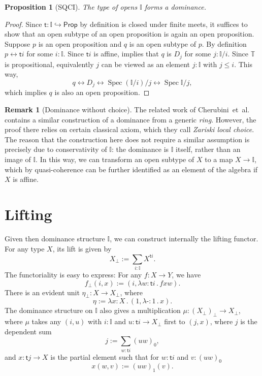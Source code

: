 \documentclass[12pt]{amsart}
\newtheorem{proposition}[theorem]{Proposition}
\theoremstyle{definition}
\newtheorem{remark}[theorem]{Remark}
\newcommand{\mbb}[1]{\mathbb{#1}}
\newcommand{\T}{\mbb T}
\newcommand{\I}{\mbb I}
\newcommand{\ms}[1]{\mathsf{#1}}
\newcommand{\hook}{\hookrightarrow}
\newcommand{\prt}{_{\bot}}
\newcommand{\ld}[2]{\lambda #1\!\colon\!\!#2\mathpunct{.}}
\newcommand{\eq}{\leftrightarrow}
\newcommand{\pp}{\ms{Prop}}
\newcommand{\hp}{\text{-}}
\newcommand{\spec}{\operatorname{Spec}}
\begin{document}
\begin{proposition}[SQCI]\label{prop:Idominance}
  The type of opens $\I$ forms a dominance.
\end{proposition}
\begin{proof}
  Since $\ms t \colon \I \hook \pp$ by definition is closed under finite meets, it suffices to show that an open subtype of an open proposition is again an open proposition. Suppose $p$ is an open proposition and $q$ is an open subtype of $p$. By definition $p \eq \ms ti$ for some $i:\I$. Since $\ms ti$ is affine,  implies that $q$ is $D_j$ for some $j : \I/i$. Since $\T$ is propositional, equivalently $j$ can be viewed as an element $j : \I$ with $j \le i$. This way, 
  \[ q \eq D_j \eq \spec(\I/i)/j \eq \spec\I/j, \]
  which implies $q$ is also an open proposition.
\end{proof}

\begin{remark}[Dominance without choice]\label{rem:dominancewithoutchoice}
  The related work of Cherubini~et~al.~\cite{Cherubini_Coquand_Hutzler_2024} contains a similar construction of a dominance from a generic \emph{ring}. However, the proof there relies on certain classical axiom, which they call \emph{Zariski local choice}. The reason that the construction here does not require a similar assumption is precisely due to conservativity of $\I$: the dominance is $\I$ itself, rather than an image of $\I$. In this way, we can transform an open subtype of $X$ to a map $X \to \I$, which by quasi-coherence can be further identified as an element of the algebra if $X$ is affine. 
\end{remark}


\section{Lifting}\label{sec:lifting}

Given then dominance structure $\I$, we can construct internally the lifting functor. For any type $X$, its lift is given by
\[ X\prt := \sum_{i:\I}X^{\ms ti}. \]
The functoriality is easy to express: For any $f : X \to Y$, we have
\[ f\prt(i,x) := (i,\ld{w}{\ms ti}fxw). \]
There is an evident unit $\eta\prt : X \to X\prt$, where
\[ \eta := \ld x X(1,\ld\hp 1 x). \]
The dominance structure on $\I$ also gives a multiplication $\mu : (X\prt)\prt \to X\prt$, where $\mu$ takes any $(i,u)$ with $i : \I$ and $u : \ms ti \to X\prt$ first to $(j,x)$, where $j$ is the dependent sum
\[ j := \sum_{w:\ms ti} (uw)_0, \]
and $x : \ms tj \to X$ is the partial element such that for $w : \ms ti$ and $v : (uw)_0$
\[ x(w,v) := (uw)_1(v). \]
\end{document}
